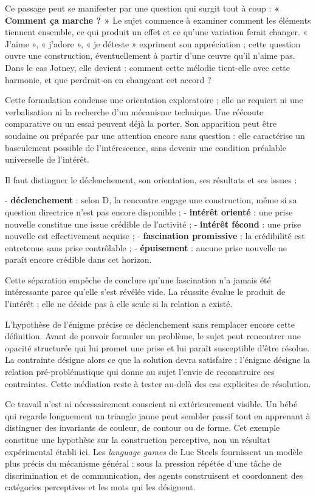 \documentclass[10pt,a4paper]{article}
\begin{document}
Ce passage peut se manifester par une question qui surgit tout à coup : \textbf{« Comment ça marche ? »} Le sujet commence à examiner comment les éléments tiennent ensemble, ce qui produit un effet et ce qu'une variation ferait changer. « J'aime », « j'adore », « je déteste » expriment son appréciation ; cette question ouvre une construction, éventuellement à partir d'une œuvre qu'il n'aime pas. Dans le cas Jotney, elle devient : comment cette mélodie tient-elle avec cette harmonie, et que perdrait-on en changeant cet accord ?

Cette formulation condense une orientation exploratoire ; elle ne requiert ni une verbalisation ni la recherche d'un mécanisme technique. Une réécoute comparative ou un essai peuvent déjà la porter. Son apparition peut être soudaine ou préparée par une attention encore sans question : elle caractérise un basculement possible de l'intérescence, sans devenir une condition préalable universelle de l'intérêt.

Il faut distinguer le déclenchement, son orientation, ses résultats et ses issues :

- \textbf{déclenchement} : selon D, la rencontre engage une construction, même si sa   question directrice n'est pas encore disponible ; - \textbf{intérêt orienté} : une prise nouvelle constitue une issue crédible de l'activité ; - \textbf{intérêt fécond} : une prise nouvelle est effectivement acquise ; - \textbf{fascination promissive} : la crédibilité est entretenue sans prise contrôlable ; - \textbf{épuisement} : aucune prise nouvelle ne paraît encore crédible dans cet horizon.

Cette séparation empêche de conclure qu'une fascination n'a jamais été intéressante parce qu'elle s'est révélée vide. La réussite évalue le produit de l'intérêt ; elle ne décide pas à elle seule si la relation a existé.

L'hypothèse de l'énigme précise ce déclenchement sans remplacer encore cette définition. Avant de pouvoir formuler un problème, le sujet peut rencontrer une opacité structurée qui lui promet une prise et lui paraît susceptible d'être résolue. La contrainte désigne alors ce que la solution devra satisfaire ; l'énigme désigne la relation pré-problématique qui donne au sujet l'envie de reconstruire ces contraintes. Cette médiation reste à tester au-delà des cas explicites de résolution.

Ce travail n'est ni nécessairement conscient ni extérieurement visible. Un bébé qui regarde longuement un triangle jaune peut sembler passif tout en apprenant à distinguer des invariants de couleur, de contour ou de forme. Cet exemple constitue une hypothèse sur la construction perceptive, non un résultat expérimental établi ici. Les \emph{language games} de Luc Steels fournissent un modèle plus précis du mécanisme général : sous la pression répétée d'une tâche de discrimination et de communication, des agents construisent et coordonnent des catégories perceptives et les mots qui les désignent.
\end{document}
